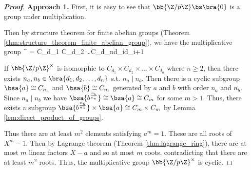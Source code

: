 \begin{proof}[\bf Proof]
{\bf Approach 1.} First, it is easy to see that $\bb{\Z/p\Z}\bs \bra{0}$ is a group under multiplication.




Then by structure theorem for finite abelian groups (Theorem \ref{thm:structure_theorem_finite_abelian_group}), we have the multiplicative group
\be
{}^{\times} = \bs {} \cong C_{d_1} \times C_{d_2} \times \dots \times C_{d_n}\quad {}d_i\mid d_{i+1}
\ee

If $\bb{\Z/p\Z}^{\times}$ is isomorphic to $C_{d_1} \times C_{d_2} \times \dots \times C_{d_n}$ where $n \geq 2$, then there exists $n_a,n_b \in \bra{d_1,d_2,\dots,d_n}$ s.t. $n_a\mid n_b$. Then there is a cyclic subgroup $\bsa{a} \cong C_{n_a}$ and $\bsa{b} \cong C_{n_b}$ generated by $a$ and $b$ with order $n_a$ and $n_b$. Since $n_a \mid n_b$ we have $\bsa{b^{\frac{n_b}{n_a}}} \cong \bsa{a} \cong C_m$ for some $m >1$. Thus, there exists a subgroup $\bsa{b^{\frac{n_b}{n_a}}} \times \bsa{a} \cong C_m \times C_m$ by Lemma \ref{lem:direct_product_of_groups}.




Thus there are at least $m^2$ elements satisfying $a^m = 1$. These are all roots of $X^m - 1$. Then by Lagrange theorem (Theorem \ref{thm:lagrange_ring}), there are at most $m$ linear factors $X - a$ and so at most $m$ roots, contradicting that there are at least $m^2$ roots. Thus, the multiplicative group $\bb{\Z/p\Z}^{\times}$ is cyclic.%


\end{proof}
